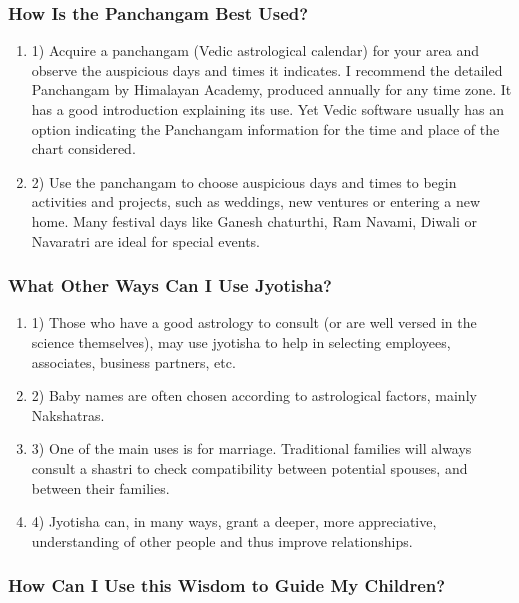 \subsubsection{How Is the Panchangam Best Used?}
 

\begin{enumerate}
\item[] 1) Acquire a panchangam (Vedic astrological calendar) for your area and observe the auspicious days and times it indicates. I recommend the detailed Panchangam by Himalayan Academy, produced annually for any time zone. It has a good introduction explaining its use. Yet Vedic software usually has an option indicating the Panchangam information for the time and place of the chart considered.

\item[] 2) Use the panchangam to choose auspicious days and times to begin activities and projects, such as weddings, new ventures or entering a new home. Many festival days like Ganesh chaturthi, Ram Navami, Diwali or Navaratri are ideal for special events.
\end{enumerate}
 

\subsubsection{What Other Ways Can I Use Jyotisha?}
 

\begin{enumerate}
\item[] 1) Those who have a good astrology to consult (or are well versed in the science themselves), may use jyotisha to help in selecting employees, associates, business partners, etc.

\item[] 2) Baby names are often chosen according to astrological factors, mainly Nakshatras.

\item[] 3) One of the main uses is for marriage. Traditional families will always consult a shastri to check compatibility between potential spouses, and between their families.

\item[] 4) Jyotisha can, in many ways, grant a deeper, more appreciative, understanding of other people and thus improve relationships.
\end{enumerate}
 

\subsubsection{How Can I Use this Wisdom to Guide My Children?}
 

